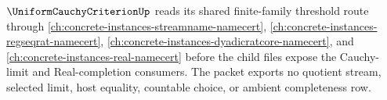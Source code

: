 $\UniformCauchyCriterionUp$ reads its shared finite-family threshold route through \autoref{ch:concrete-instances-streamname-namecert}, \autoref{ch:concrete-instances-regseqrat-namecert}, \autoref{ch:concrete-instances-dyadicratcore-namecert}, and \autoref{ch:concrete-instances-real-namecert} before the child files expose the Cauchy-limit and Real-completion consumers. The packet exports no quotient stream, selected limit, host equality, countable choice, or ambient completeness row.





